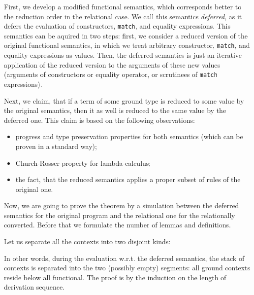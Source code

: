 First, we develop a modified functional semantics, which corresponds better to the reduction
order in the relational case. We call this semantics \emph{deferred}, as it defers the evaluation
of constructors, \lstinline|match|, and equality expressions. This semantics can be aquired in
two steps: first, we consider a reduced version of the original functional semantics, in which
we treat arbitrary constructor, \lstinline|match|, and equality expressions as values. Then, the
deferred semantics is just an iterative application of the reduced version to the arguments 
of these new values (arguments of constructors or equality operator, or scrutinees of \lstinline|match| 
expressions).

Next, we claim, that if a term of some ground type is reduced to some value by the original semantics,
then it as well is reduced to the same value by the deferred one. This claim is based on the following
observations:

\begin{itemize}
\item progress and type preservation properties for both semantics (which can be proven in a standard
way);
\item Church-Rosser property for lambda-calculus;
\item the fact, that the reduced semantics applies a proper subset of rules of the original one.
\end{itemize}

Now, we are going to prove the theorem by a simulation between the deferred semantics for the original program
and the relational one for the relationally converted. Before that we formulate the number of lemmas and 
definitions.

\begin{lemma}
\label{stack_split}
\normalfont Let us separate all the contexts into two disjoint kinds: 


In other words, during the evaluation w.r.t. the deferred semantics, the stack of contexts is separated into the two
(possibly empty) segments: all ground contexts reside below all functional. The proof is by the induction on the
length of derivation sequence.
\end{lemma}

